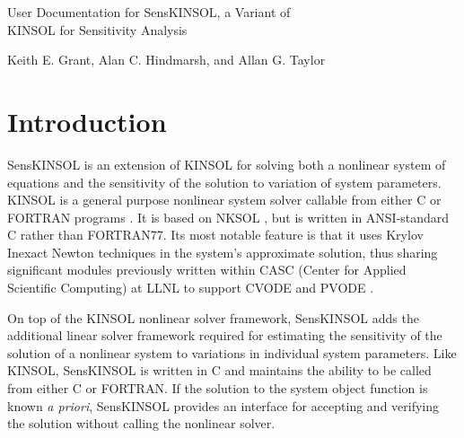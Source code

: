 \documentclass[11pt]{article}
\newcommand{\thisdoc}{User Documentation for SensKINSOL, a Variant of
\\KINSOL for Sensitivity Analysis}
\newcommand{\writers}{Keith E. Grant, Alan C. Hindmarsh, and Allan
G. Taylor}
\begin{document}

\newpage
\begin{center}
\LARGE
\thisdoc
\par\bigskip\medskip
\large
\writers
\par\bigskip\bigskip
\normalsize
\end{center}

\tableofcontents
\newpage
%
%
\maketitle
{}
\setcounter{page}{1}
\setlength{\parindent}{0pt}
\setlength{\parskip}{1.5ex plus 0.5ex minus 0.2ex}

\section{Introduction}

SensKINSOL is an extension of KINSOL for solving both a nonlinear
system of equations and the sensitivity of the solution to variation
of system parameters. KINSOL is a general purpose nonlinear system
solver callable from either C or FORTRAN programs
\cite{KINSOLusrguide}. It is based on NKSOL \cite{BrSa90}, but is
written in ANSI-standard C rather than FORTRAN77.  Its most notable
feature is that it uses Krylov Inexact Newton techniques in the
system's approximate solution, thus sharing significant modules
previously written within CASC (Center for Applied Scientific
Computing) at LLNL to support CVODE \cite{CoHi94,CoHi96} and PVODE
\cite{LDRD98,PVODEusrguide,ByHi99}.

On top of the KINSOL nonlinear solver framework, SensKINSOL adds the
additional linear solver framework required for estimating the
sensitivity of the solution of a nonlinear system to variations in
individual system parameters. Like KINSOL, SensKINSOL is written in C
and maintains the ability to be called from either C or FORTRAN. If the
solution to the system object function is known {\it a priori},
SensKINSOL provides an interface for accepting and verifying the
solution without calling the nonlinear solver.
\end{document}
